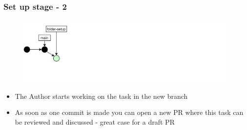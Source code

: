 \documentclass[aspectratio=169]{beamer} %
\begin{document}
\begin{frame}
	\frametitle{Set up stage - 2}

	\vspace{-.5cm}
	\begin{minipage}[t][5cm][t]{\textwidth}
		\begin{figure}
			\centering
			\includegraphics[width=\textwidth]{./img/dime-gitflow-network-1-1.png}
		\end{figure}
	\end{minipage}

	\vspace{-.5cm}
	\begin{minipage}[t][5cm][t]{\textwidth}
		\begin{itemize}
			\setlength\itemsep{.5em}
			\item The Author starts working on the task in the new branch
			\item As soon as one commit is made you can open a new PR 
			where this task can be reviewed and discussed - great case for a draft PR
		\end{itemize}
	\end{minipage}

\end{frame}
\end{document}
